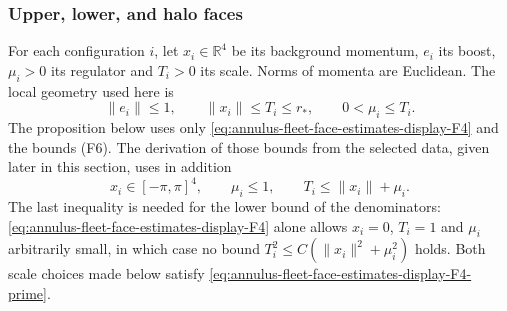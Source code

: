 \subsubsection{Upper, lower, and halo faces}

For each configuration $i$, let $x_i\in\mathbb R^4$ be its background
momentum, $e_i$ its boost, $\mu_i>0$ its regulator and $T_i>0$ its
scale. Norms of momenta are Euclidean. The local geometry used here is
\begin{equation}
 \|e_i\|\leq1,\qquad \|x_i\|\leq T_i\leq r_*,\qquad
 0<\mu_i\leq T_i.
 \label{eq:annulus-fleet-face-estimates-display-F4}
\end{equation}
The proposition below uses only \eqref{eq:annulus-fleet-face-estimates-display-F4} and the bounds (F6). The derivation
of those bounds from the selected data, given later in this section,
uses in addition
\begin{equation}
 x_i\in[-\pi,\pi]^4,\qquad \mu_i\leq1,\qquad
 T_i\leq\|x_i\|+\mu_i.
 \label{eq:annulus-fleet-face-estimates-display-F4-prime}
\end{equation}
The last inequality is needed for the lower bound of the denominators:
\eqref{eq:annulus-fleet-face-estimates-display-F4} alone allows $x_i=0$, $T_i=1$ and $\mu_i$ arbitrarily small, in
which case no bound $T_i^2\leq C(\|x_i\|^2+\mu_i^2)$ holds. Both scale
choices made below satisfy \eqref{eq:annulus-fleet-face-estimates-display-F4-prime}.

